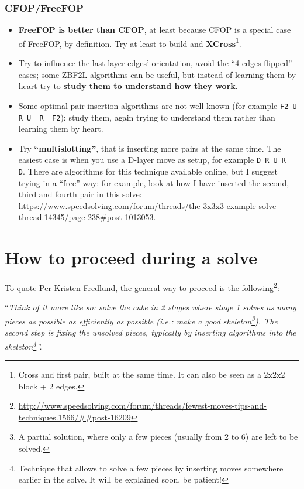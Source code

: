 \documentclass[11pt,a4paper]{book}
\newcommand{\p}{\textquotesingle}
\newcommand{\m}{\texttt}
\newcommand{\ps}{\p\,\,}
\begin{document}
\subsection{CFOP/FreeFOP}
\begin{itemize}
\item \textbf{FreeFOP is better than CFOP}, at least because CFOP is a special case of FreeFOP, by definition. Try at least to build and \textbf{XCross}\footnote{Cross and first pair, built at the same time. It can also be seen as a 2x2x2 block + 2 edges.}.
\item Try to influence the last layer edges' orientation, avoid the ``4 edges flipped'' cases; some ZBF2L algorithms can be useful, but instead of learning them by heart try to \textbf{study them to understand how they work}.
\item Some optimal pair insertion algorithms are not well known (for example \m{F2 U R U\ps R\ps F2}): study them, again trying to understand them rather than learning them by heart.
\item Try \textbf{``multislotting''}, that is inserting more pairs at the same time. The easiest case is when you use a D-layer move as setup, for example \m{D R U R\ps D\p}. There are algorithms for this technique available online, but I suggest trying in a ``free'' way: for example, look at how I have inserted the second, third and fourth pair in this solve: \url{https://www.speedsolving.com/forum/threads/the-3x3x3-example-solve-thread.14345/page-238#post-1013053}.
\end{itemize}

\chapter{How to proceed during a solve}

To quote Per Kristen Fredlund, the general way to proceed is the following\footnote{\url{http://www.speedsolving.com/forum/threads/fewest-moves-tips-and-techniques.1566/##post-16209}}:

\begin{center}“\emph{Think of it more like so: solve the cube in 2 stages where stage 1 solves as many pieces as possible as efficiently as possible (i.e.: make a good skeleton\footnote{A partial solution, where only a few pieces (usually from 2 to 6) are left to be solved.}). The second step is fixing the unsolved pieces, typically by inserting algorithms into the skeleton\footnote{Technique that allows to solve a few pieces by inserting moves somewhere earlier in the solve. It will be explained soon, be patient!}''.}
\end{center}
\end{document}
